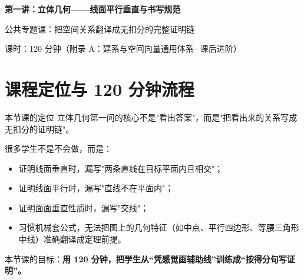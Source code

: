 \documentclass[11pt,a4paper]{ctexart}
\begin{document}
\begin{center}
  {\Large\bfseries 第一讲：立体几何——线面平行垂直与书写规范}\par
  \vspace{0.3em}
  {\large 公共专题课：把空间关系翻译成无扣分的完整证明链}\par
  \vspace{0.3em}
  {\small 课时：120 分钟\quad （附录 A：建系与空间向量通用体系·课后进阶）}
\end{center}

\section{课程定位与 120 分钟流程}

\begin{teachbox}{本节课的定位}
立体几何第一问的核心不是"看出答案"，而是"把看出来的关系写成无扣分的证明链"。

很多学生不是不会做，而是：
\begin{itemize}[leftmargin=2em, itemsep=0.1em]
  \item 证明线面垂直时，漏写"两条直线在目标平面内且相交"；
  \item 证明线面平行时，漏写"直线不在平面内"；
  \item 证明面面垂直性质时，漏写"交线"；
  \item 习惯机械套公式，无法把图上的几何特征（如中点、平行四边形、等腰三角形中线）准确翻译成定理前提。
\end{itemize}

本节课的目标：\textbf{用 120 分钟，把学生从“凭感觉画辅助线”训练成“按得分句写证明”。}
\end{teachbox}
\end{document}
